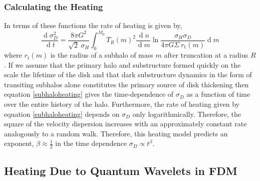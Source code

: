 \documentclass[usenatbib]{mnras}
\renewcommand{\d}[1]{\! \mathrm{d}#1 \:}
\newcommand{\deriv}[2]{\frac{\d{#1}}{\d{#2}}}
\renewcommand{\d}[1]{\ensuremath{\operatorname{d}\!{#1}}}
\begin{document}
\subsubsection{Calculating the Heating}

In terms of these functions the rate of heating is given by,
\begin{equation} \label{subhaloheating}
\deriv{\sigma_D^2}{t} = \frac{8 \pi G^2}{\sqrt{2} \: \sigma_H} \int_0^{M_p} T_R(m)^2  \deriv{n}{m}  \ln{\frac{\sigma_H \sigma_D}{4 \pi G \Sigma \: r_{\text{t}}(m)}} \d{m}
\end{equation}   
where $r_{\text{t}}(m)$ is the radius of a subhalo of mass $m$ after truncation at a radius $R$. 
If we assume that the primary halo and substructure formed quickly on the scale the lifetime of the disk and that dark substructure dynamics in the form of transiting subhalos alone constitutes the primary source of disk thickening then equation \eqref{subhaloheating} gives the time-dependence of $\sigma_D$ as a function of time over the entire history of the halo. Furthermore, the rate of heating given by equation \eqref{subhaloheating} depends on $\sigma_D$ only logarithmically. Therefore, the square of the velocity dispersion increases with an approximately constant rate analogously to a random walk. Therefore, this heating model predicts an exponent, $\beta \approx \tfrac{1}{2}$ in the time dependence $\sigma_D \propto t^{\beta}$.

\subsection{Heating Due to Quantum Wavelets in FDM}
\end{document}
